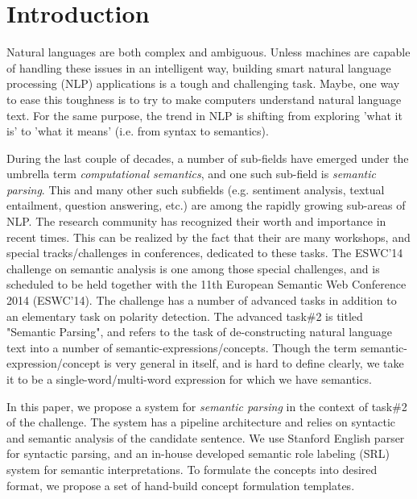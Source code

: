 \documentclass[runningheads,a4paper]{llncs}
\begin{document}
\section{Introduction}
Natural languages are both complex and ambiguous. Unless machines are capable of handling these issues in an intelligent way, building smart natural language processing (NLP) applications is a tough and challenging task. Maybe, one way to ease this toughness is to try to make computers understand natural language text. For the same purpose, the trend in NLP is shifting from exploring 'what it is' to 'what it means' (i.e. from syntax to semantics). 

During the last couple of decades, a number of sub-fields have emerged under the umbrella term \textit{computational semantics}, and one such sub-field is \textit{semantic parsing}. This and many other such subfields (e.g. sentiment analysis, textual entailment, question answering, etc.) are among the rapidly growing sub-areas of NLP. The research community has recognized their worth and importance in recent times. This can be realized by the fact that their are many workshops, and special tracks/challenges in conferences, dedicated to these tasks. The ESWC'14 challenge on semantic analysis is one among those special challenges, and is scheduled to be held together with the 11th European Semantic Web Conference 2014 (ESWC'14). The challenge has a number of advanced tasks in addition to an elementary task on polarity detection. The advanced task\#2 is titled "Semantic Parsing", and refers to the task of de-constructing natural language text into a number of semantic-expressions/concepts. Though the term semantic-expression/concept is very general in itself, and is hard to define clearly, we take it to be a single-word/multi-word expression for which we have semantics.  


In this paper, we propose a system for \textit{semantic parsing} in the context of task\#2 of the challenge. The system has a pipeline architecture and relies on syntactic and semantic analysis of the candidate sentence. We use Stanford English parser \cite{stanford} for syntactic parsing, and an in-house developed semantic role labeling (SRL) system for semantic interpretations. To formulate the concepts into desired format, we propose a set of hand-build concept formulation templates. 
                
\end{document}
